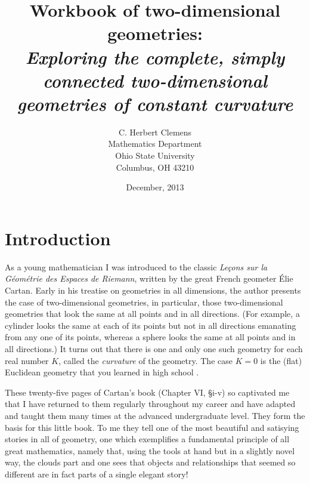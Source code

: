 \documentclass{article}%
\begin{document}
\title{\textbf{Workbook of two-dimensional geometries:}\\\textit{Exploring the complete, simply connected two-dimensional geometries of
constant curvature}}
\author{C. Herbert Clemens\\Mathematics Department\\Ohio State University\\Columbus, OH 43210 }
\date{December, 2013}
\maketitle
\tableofcontents

\pagebreak

\section{Introduction}

As a young mathematician I was introduced to the classic \textit{Le\c{c}ons
sur la G\'{e}om\'{e}trie des Espaces de Riemann}, written by the great French
geometer \'{E}lie Cartan. Early in his treatise on geometries in all
dimensions, the author presents the case of two-dimensional geometries, in
particular, those two-dimensional geometries that look the same at all points
and in all directions. (For example, a cylinder looks the same at each of its
points but not in all directions emanating from any one of its points, whereas
a sphere looks the same at all points and in all directions.) It turns out
that there is one and only one such geometry for each real number $K$, called
the \textit{curvature} of the geometry. The case $K=0$ is the (flat) Euclidean
geometry that you learned in high school .

These twenty-five pages of Cartan's book (Chapter VI, \S i-v) so captivated me
that I have returned to them regularly throughout my career and have adapted
and taught them many times at the advanced undergraduate level. They form the
basis for this little book. To me they tell one of the most beautiful and
satisying stories in all of geometry, one which exemplifies a fundamental
principle of all great mathematics, namely that, using the tools at hand but
in a slightly novel way, the clouds part and one sees that objects and
relationships that seemed so different are in fact parts of a single elegant story!
\end{document}

